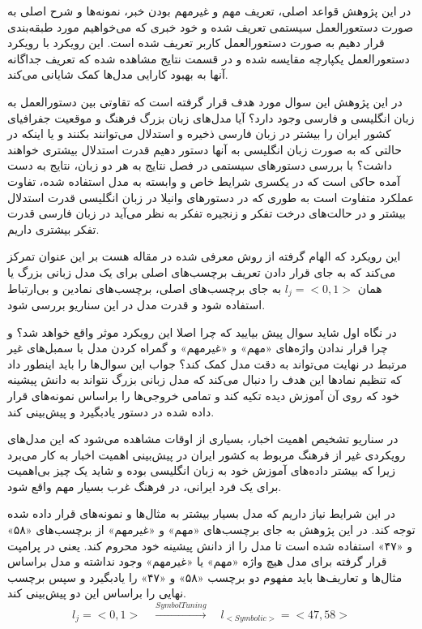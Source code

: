 در این پژوهش قواعد اصلی، تعریف مهم و غیرمهم بودن خبر، نمونه‌ها و شرح اصلی به صورت دستعورالعمل‌ سیستمی تعریف شده و خود خبری که می‌خواهیم مورد طبقه‌بندی قرار دهیم به صورت دستعورالعمل‌ کاربر تعریف شده است. این رویکرد با رویکرد دستعورالعمل یکپارچه مقایسه شده و در قسمت نتایج مشاهده شده که تعریف جداگانه آنها به بهبود کارایی مدل‌ها کمک شایانی می‌کند.

در این پژوهش این سوال مورد هدف قرار گرفته است که تقاوتی بین دستورالعمل به زبان انگلیسی و فارسی وجود دارد؟ آیا مدل‌های زبان بزرگ فرهنگ و موقعیت‌ جفرافیای کشور ایران را بیشتر در زبان فارسی ذخیره و استدلال می‌توانند بکنند و یا اینکه در حالتی که به صورت زبان انگلیسی به آنها دستور دهیم قدرت استدلال بیشتری خواهند داشت؟ با بررسی دستور‌های سیستمی در فصل نتایج به هر دو زبان، نتایج به دست آمده حاکی است که در یکسری شرایط خاص و وابسته به مدل استفاده شده، تفاوت عملکرد متفاوت است به طوری که در دستورهای وانیلا در زبان انگلیسی قدرت استدلال بیشتر و در حالت‌های درخت تفکر و زنجیره تفکر به نظر می‌آید در زبان فارسی قدرت تفکر بیشتری داریم.

این رویکرد که الهام گرفته از روش معرفی شده در مقاله
هست بر این عنوان تمرکز می‌کند که به جای قرار دادن تعریف برچسب‌های اصلی برای یک مدل زبانی بزرگ یا همان
$l_j = <0,1>$
به جای برچسب‌های اصلی، برچسب‌های نمادین و بی‌ارتباط استفاده شود و قدرت مدل در این سناریو بررسی شود.

در نگاه اول شاید سوال پیش بیایید که چرا اصلا این رویکرد موثر واقع خواهد شد؟ و چرا قرار ندادن واژه‌های «مهم» و «غیرمهم» و گمراه کردن مدل با سمبل‌های غیر مرتبط در نهایت می‌تواند به دقت مدل کمک کند؟ جواب این سوال‌ها را باید اینطور داد که تنظیم نمادها این هدف را دنبال می‌کند که مدل زبانی بزرگ نتواند به دانش پیشینه خود که روی آن آموزش دیده تکیه کند و تمامی خروجی‌ها را براساس نمونه‌های قرار داده شده در دستور یادبگیرد و پیش‌بینی کند.

در سناریو تشخیص اهمیت اخبار، بسیاری از اوقات مشاهده می‌شود که این مدل‌های رویکردی غیر از فرهنگ مربوط به کشور ایران در پیش‌بینی اهمیت اخبار به کار می‌برد زیرا که بیشتر داده‌های‌ آموزش خود به زبان انگلیسی بوده و شاید یک چیز بی‌اهمیت برای یک فرد ایرانی، در فرهنگ غرب بسیار مهم واقع شود.

در این شرایط نیاز داریم که مدل بسیار بیشتر به مثال‌ها و نمونه‌های قرار داده شده توجه کند. در این پژوهش به جای برچسب‌های «مهم» و «غیرمهم» از برچسب‌های «۵۸» و «۴۷» استفاده شده است تا مدل را از دانش پیشینه خود محروم کند. یعنی در پرامپت قرار گرفته برای مدل هیچ واژه «مهم» یا «غیرمهم» وجود نداشته و مدل براساس مثال‌ها و تعاریف‌ها باید مفهوم دو برچسب «۵۸» و «۴۷» را یادبگیرد و سپس برچسب‌ نهایی را براساس این دو پیش‌بینی کند.
\begin{equation}
    l_j = <0,1> \quad \xrightarrow{Symbol Tuning} \quad l_{<Symbolic>} = <47, 58>
\end{equation}

